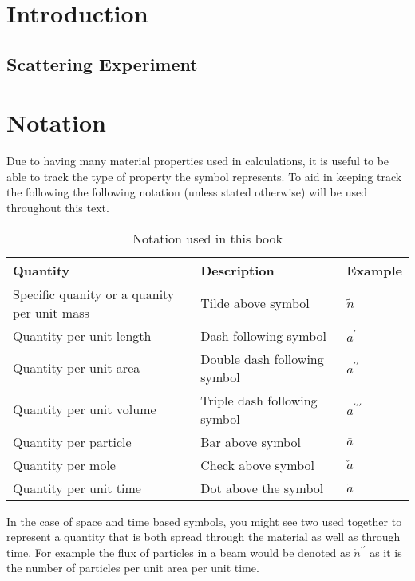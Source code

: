 \documentclass[a4paper,12pt]{book}
\begin{document}

\frontmatter
\tableofcontents
\listoftables
\listoffigures
\clearpage

\mainmatter
\chapter{Introduction}
\section{Scattering Experiment}

\clearpage
\appendix
\chapter{Notation}
Due to having many material properties used in calculations, it is useful to be able to track the type of property the symbol represents. To aid in keeping track the following the following notation (unless stated otherwise) will be used throughout this text.
\begin{table}[h]
  \centering
\begin{tabular}{ p{5cm} | p{5cm} | l }
  Quantity & Description & Example \\
  \hline
  Specific quanity or a quanity per unit mass & Tilde above symbol & $\tilde{n}$ \\
  Quantity per unit length & Dash following symbol & $a^{\prime}$ \\
  Quantity per unit area & Double dash following symbol & $a^{\prime\prime}$ \\
  Quantity per unit volume & Triple dash following symbol & $a^{\prime\prime\prime}$ \\
  Quantity per particle & Bar above symbol & $\bar{a}$ \\
  Quantity per mole & Check above symbol & $\check{a}$ \\
  Quantity per unit time & Dot above the symbol & $\dot{a}$\\
\end{tabular}
\caption{Notation used in this book} \label{table:notation}
\end{table}
In the case of space and time based symbols, you might see two used together to represent a quantity that is both spread through the material as well as through time. For example the flux of particles in a beam would be denoted as $\dot{n}^{\prime\prime}$ as it is the number of particles per unit area per unit time.
\clearpage
{}
\printindex
\end{document}
